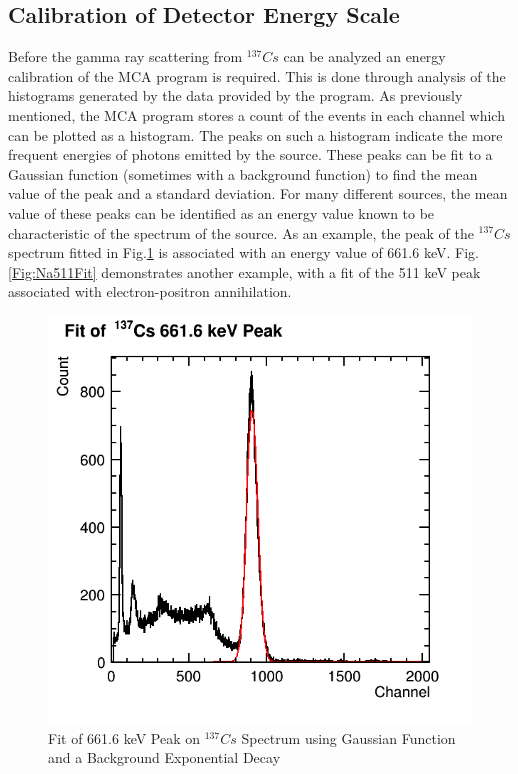 \documentclass[%
 reprint,
 amsmath,amssymb,
 aps,
 pra,
]{revtex4-1}
\begin{document}
\subsection{Calibration of Detector Energy Scale}
Before the gamma ray scattering from $^{137}Cs$ can be analyzed an energy calibration of the MCA program is required. This is done through analysis of the histograms generated by the data provided by the program. As previously mentioned, the MCA program stores a count of the events in each channel which can be plotted as a histogram. The peaks on such a histogram indicate the more frequent energies of photons emitted by the source. These peaks can be fit to a Gaussian function (sometimes with a background function) to find the mean value of the peak and a standard deviation. For many different sources, the mean value of these peaks can be identified as an energy value known to be characteristic of the spectrum of the source. As an example, the peak of the $^{137}Cs$ spectrum fitted in Fig.\ref{Fig:CsUncalib} is associated with an energy value of 661.6 keV. Fig.\ref{Fig:Na511Fit} demonstrates another example, with a fit of the 511 keV peak associated with electron-positron annihilation.
\begin{figure}[H]
\centering	
	\includegraphics[scale=0.3]{Cs662keVFit.png}
	\caption{Fit of 661.6 keV Peak on $^{137}Cs$ Spectrum using Gaussian Function and a Background Exponential Decay}
	\label{Fig:CsUncalib}
\end{figure}
\end{document}

